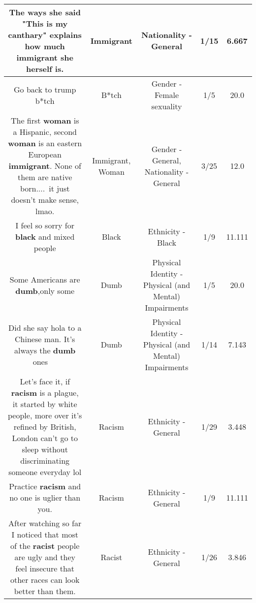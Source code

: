 \documentclass[11pt]{article}
\newlength\mylength
\begin{document}
\begin{center}
\begin{longtable}{|C{.65\mylength}|C{.30\mylength}|C{.12\mylength}|C{.12\mylength}|C{.12\mylength}|}
  \small The ways she said "This is my canthary" explains how much \textbf{immigrant} she herself is.\normalsize   & Immigrant & Nationality - General & 1/15 & 6.667 \\  \hline
  \small Go back to trump b*tch\normalsize   & B*tch & Gender - Female sexuality & 1/5 & 20.0 \\  \hline
  \small The first \textbf{woman} is a Hispanic, second \textbf{woman} is an eastern European \textbf{immigrant}. None of them are native born.... it just doesn't make sense, lmao.\normalsize   & Immigrant, Woman & Gender - General, Nationality - General & 3/25 & 12.0 \\  \hline
  \small I feel so sorry for \textbf{black} and mixed people\normalsize   & Black & Ethnicity - Black & 1/9 & 11.111 \\  \hline
  \small Some Americans are \textbf{dumb},only some\normalsize   & Dumb & Physical Identity - Physical (and Mental) Impairments & 1/5 & 20.0 \\  \hline
  \small Did she say hola to a Chinese man. It's always the \textbf{dumb} ones 🤦🏾‍♀️\normalsize   & Dumb & Physical Identity - Physical (and Mental) Impairments & 1/14 & 7.143 \\  \hline
  \small Let's face it, if \textbf{racism} is a plague, it started by white people, more over it's refined by British, London can't go to sleep without discriminating someone everyday lol\normalsize   & Racism & Ethnicity - General & 1/29 & 3.448 \\  \hline
  \small Practice \textbf{racism} and no one is uglier than you.\normalsize   & Racism & Ethnicity - General & 1/9 & 11.111 \\  \hline
  \small After watching so far I noticed that most of the \textbf{racist} people are ugly and they feel insecure that other races can look better than them.\normalsize   & Racist & Ethnicity - General & 1/26 & 3.846 \\  \hline

\end{longtable}
\end{center}
\end{document}
